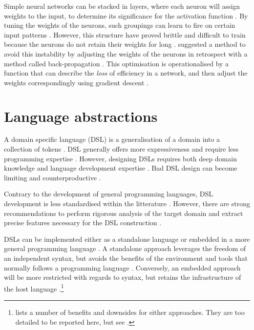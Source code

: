 \documentclass[a4paper,oneside]{memoir}
\begin{document}
Simple neural networks can be stacked in layers, where each neuron will assign
weights to the input, to determine its significance for the activation function
\autocite{Nilsson2009}. By tuning the weights of the neurons, such groupings can
learn to fire on certain input patterns \autocite{russel2007}. However,
this structure have proved brittle and difficult to train because the
neurons do not retain their weights for long \autocite{Nilsson2009, russel2007}.
\autocite{Rumelhart1988} suggested a method to avoid this instability by adjusting
the weights of the neurons in retrospect with a method called back-propagation
\autocite{Rumelhart1988, Nilsson2009}. This optimisation is
operationalised by a function that can describe the \textit{loss} of efficiency
in a network, and then adjust the weights correspondingly using gradient
descent \autocite{russel2007}.

\section{Language abstractions}
A domain specific language (DSL) is a generalisation of a domain into a
collection of tokens \autocite{Mernik2005}. DSL generally offers more
expressiveness and require less programming expertise \autocite{Mernik2005, Sestoft2017}.
However, designing DSLs requires both deep domain knowledge and language
development expertise \autocite{Mernik2005}. Bad DSL design can become limiting
and counterproductive \autocite{Mernik2005}.

Contrary to the development of general programming languages, DSL development
is less standardised within the litterature \autocite{Mernik2005, Deursen2002}.
However, there are strong recommendations to perform rigorous analysis of the
target domain and extract precise features necessary for the DSL construction
\autocite{Mernik2005, Deurson2002}.

DSLs can be implemented either as a standalone language or embedded in a more
general programming language \autocite{Mernik2005}. A standalone approach
leverages the freedom of an independent syntax, but avoids the benefits of
the environment and tools that normally follows a programming language
\autocite{Mernik2005, Sestoft2017}. Conversely, an embedded approach will be
more restricted with regards to syntax, but retains the infrastructure of the
host language \autocite{Mernik2005}.\footnote{\cite{Mernik2005} lists a
number of benefits and downsides for either approaches. They are too
detailed to be reported here, but see \autocite[330-331]{Mernik2005}.}
\end{document}
